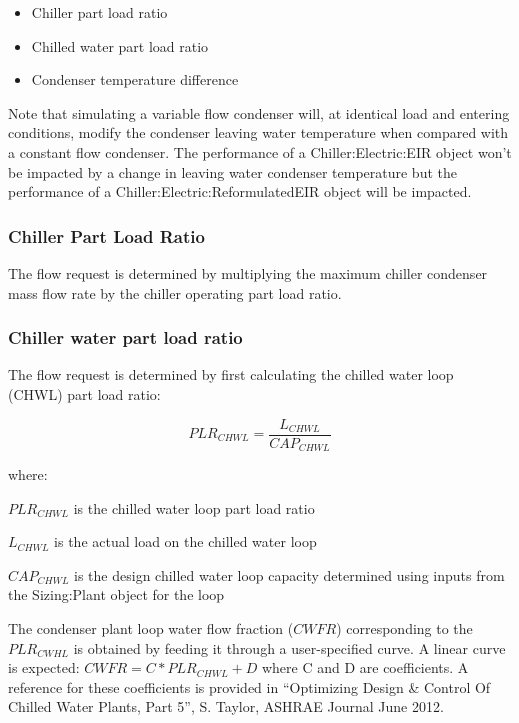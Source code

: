 \begin{itemize}
  \item Chiller part load ratio
  \item Chilled water part load ratio
  \item Condenser temperature difference
\end{itemize}

Note that simulating a variable flow condenser will, at identical load and entering conditions, modify the condenser leaving water temperature when compared with a constant flow condenser. The performance of a Chiller:Electric:EIR object won't be impacted by a change in leaving water condenser temperature but the performance of a Chiller:Electric:ReformulatedEIR object will be impacted.

\subsubsection{Chiller Part Load Ratio}

The flow request is determined by multiplying the maximum chiller condenser mass flow rate by the chiller operating part load ratio.

\subsubsection{Chiller water part load ratio}

The flow request is determined by first calculating the chilled water loop (CHWL) part load ratio:

\begin{equation}
{PLR_{CHWL}} = \frac{{L_{CHWL}}}{CAP_{CHWL}}
\end{equation}

where:

\({PLR_{CHWL}}\) is the chilled water loop part load ratio

\({L_{CHWL}}\) is the actual load on the chilled water loop

\({CAP_{CHWL}}\) is the design chilled water loop capacity determined using inputs from the Sizing:Plant object for the loop


The condenser plant loop water flow fraction (\({CWFR}\)) corresponding to the \({PLR_{CWHL}}\) is obtained by feeding it through a user-specified curve. A linear curve is expected: \(CWFR = C * {PLR_{CHWL}} + D\)  where C and D are coefficients. A reference for these coefficients is provided in ``Optimizing Design \& Control Of Chilled Water Plants, Part 5'', S. Taylor, ASHRAE Journal June 2012.

